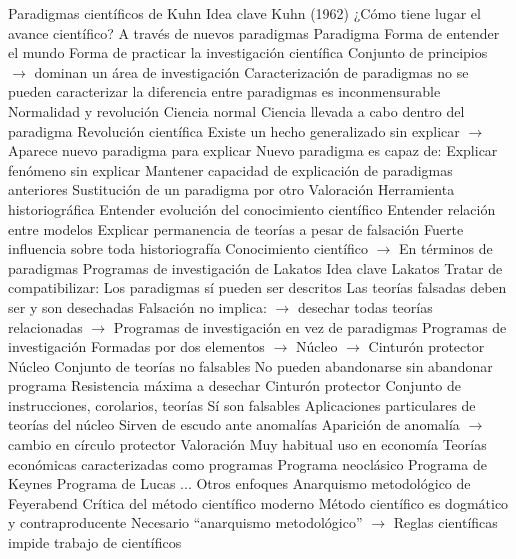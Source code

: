 \documentclass{nuevotema}
\begin{document}
\begin{esquemal}
		\2 Paradigmas científicos de Kuhn
			\3 Idea clave
				\4 Kuhn (1962)
				\4 ¿Cómo tiene lugar el avance científico?
				\4[] A través de nuevos paradigmas
				\4 Paradigma
				\4[] Forma de entender el mundo
				\4[] Forma de practicar la investigación científica
				\4[] Conjunto de principios
				\4[] $\to$ dominan un área de investigación
				\4 Caracterización de paradigmas
				\4[] no se pueden caracterizar
				\4[] la diferencia entre paradigmas es inconmensurable
			\3 Normalidad y revolución
				\4 Ciencia normal
				\4[] Ciencia llevada a cabo dentro del paradigma
				\4 Revolución científica
				\4[] Existe un hecho generalizado sin explicar
				\4[] $\to$ Aparece nuevo paradigma para explicar
				\4 Nuevo paradigma es capaz de:
				\4[] Explicar fenómeno sin explicar
				\4[] Mantener capacidad de explicación de paradigmas anteriores
				\4[$\Rightarrow$] Sustitución de un paradigma por otro
			\3 Valoración
				\4 Herramienta historiográfica
				\4[] Entender evolución del conocimiento científico
				\4[] Entender relación entre modelos
				\4[] Explicar permanencia de teorías a pesar de falsación
				\4 Fuerte influencia sobre toda historiografía
				\4[] Conocimiento científico
				\4[] $\to$ En términos de paradigmas
		\2 Programas de investigación de Lakatos
			\3 Idea clave
				\4 Lakatos
				\4 Tratar de compatibilizar:
				\4[] Los paradigmas sí pueden ser descritos
				\4[] Las teorías falsadas deben ser y son desechadas
				\4[] Falsación no implica:
				\4[] $\to$ desechar todas teorías relacionadas
				\4[] $\to$ Programas de investigación en vez de paradigmas
				\4 Programas de investigación
				\4[] Formadas por dos elementos
				\4[] $\to$ Núcleo
				\4[] $\to$ Cinturón protector
			\3 Núcleo
				\4 Conjunto de teorías no falsables
				\4 No pueden abandonarse sin abandonar programa
				\4 Resistencia máxima a desechar
			\3 Cinturón protector
				\4 Conjunto de instrucciones, corolarios, teorías
				\4[] Sí son falsables
				\4 Aplicaciones particulares de teorías del núcleo
				\4 Sirven de escudo ante anomalías
				\4 Aparición de anomalía
				\4 $\to$ cambio en círculo protector
			\3 Valoración
				\4 Muy habitual uso en economía
				\4 Teorías económicas caracterizadas como programas
				\4[] Programa neoclásico
				\4[] Programa de Keynes
				\4[] Programa de Lucas
				\4[] ...
		\2 Otros enfoques
			\3 Anarquismo metodológico de Feyerabend
				\4 Crítica del método científico moderno
				\4[] Método científico es dogmático y contraproducente
				\4 Necesario ``anarquismo metodológico''
				\4[] $\to$ Reglas científicas impide trabajo de científicos

\end{esquemal}
\end{document}
